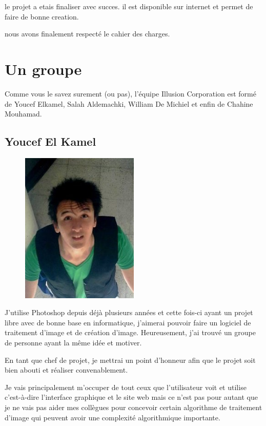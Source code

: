 \documentclass[12pt, a4paper]{report}
\begin{document}
\par le projet a etais finaliser avec succes. il est disponible sur internet et permet de faire de bonne creation.
\par nous avons finalement respecté le cahier des charges. 

\newpage


\chapter{Un groupe}

Comme vous le savez surement (ou pas), l'\'equipe Illusion Corporation est form\' e de Youcef Elkamel, Salah Aldemachki, William De Michiel et enfin de Chahine Mouhamad. 


\section{Youcef El Kamel}

\begin{figure}[!h]
\begin{center} \includegraphics[width=0.5\textwidth]{images/youcef.png} \end{center}
\end{figure}

\par J’utilise Photoshop depuis déjà plusieurs années et cette fois-ci ayant un projet libre avec de bonne base en informatique, j’aimerai pouvoir faire un logiciel de traitement d’image et de création d’image. Heureusement, j’ai trouvé un groupe de personne ayant la même idée et motiver.
\par En tant que chef de projet, je mettrai un point d’honneur afin que le projet soit bien abouti et réaliser convenablement.
\par Je vais principalement m’occuper de tout ceux que l’utilisateur voit et utilise c’est-à-dire l’interface graphique et le site web mais ce n’est pas pour autant que je ne vais pas aider mes collègues pour concevoir certain algorithme de traitement d’image qui peuvent avoir une complexité algorithmique importante.
\end{document}
